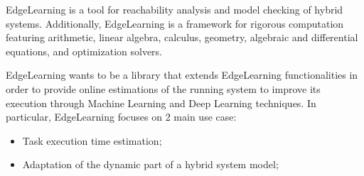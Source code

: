 EdgeLearning is a tool for reachability analysis and model checking of hybrid systems. Additionally, EdgeLearning is a framework for rigorous computation featuring arithmetic, linear algebra, calculus, geometry, algebraic and differential equations, and optimization solvers.

EdgeLearning wants to be a library that extends EdgeLearning functionalities in order to provide online estimations of the running system to improve its execution through Machine Learning and Deep Learning techniques. In particular, EdgeLearning focuses on 2 main use case: 
\begin{itemize}
	\item Task execution time estimation;
	\item Adaptation of the dynamic part of a hybrid system model;
\end{itemize}

